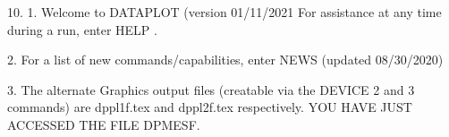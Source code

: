 10.
1. Welcome to DATAPLOT (version 01/11/2021  For assistance at
   any time during a run, enter HELP   .

2. For a list of new commands/capabilities,
   enter NEWS  (updated 08/30/2020)

3. The alternate Graphics output files (creatable
   via the DEVICE 2 and 3 commands) are
   dppl1f.tex and dppl2f.tex respectively.
YOU HAVE JUST ACCESSED THE FILE DPMESF.
